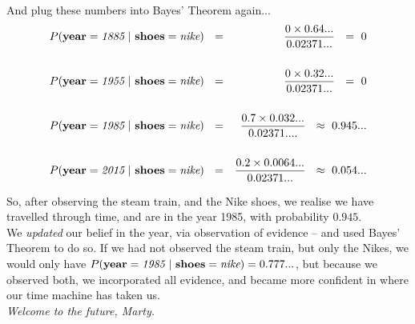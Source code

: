 \documentclass[a4paper,10pt]{article}
\begin{document}
\noindent And plug these numbers into Bayes' Theorem again...
\begin{eqnarray*}
P({\bf year}=\textit{1885}~|~{\bf shoes}=\textit{nike})~~&=& \frac{0\times 0.64...}{0.02371...}~~=~0\\~\\
P({\bf year}=\textit{1955}~|~{\bf shoes}=\textit{nike})~~&=& \frac{0\times 0.32...}{0.02371...}~~=~0\\~\\
P({\bf year}=\textit{1985}~|~{\bf shoes}=\textit{nike})~~&=& \frac{0.7\times 0.032...}{0.02371....}~~\approx~0.945...\\~\\
P({\bf year}=\textit{2015}~|~{\bf shoes}=\textit{nike})~~&=& \frac{0.2\times 0.0064...}{0.02371...}~~\approx~0.054...\\
\end{eqnarray*}

\noindent So, after observing the steam train, and the Nike shoes, we realise we have travelled through time, and
are in the year 1985, with probability $0.945$.\\

\noindent We {\em updated} our belief in the year, via observation of evidence -- and used Bayes' Theorem to do so.
If we had not observed the steam train, but only the Nikes, we would only have $P({\bf year}=\textit{1985}~|~{\bf shoes}=\textit{nike}) = 0.777...$, but because we observed both, we incorporated all evidence, and became more confident in where our time machine has taken us.\\

\noindent \em Welcome to the future, Marty.



\end{document}
